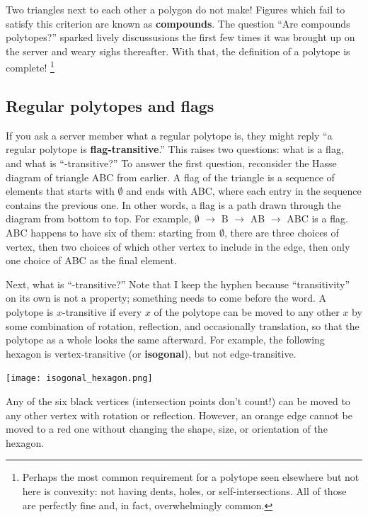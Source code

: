 \documentclass{article}
\begin{document}
Two triangles next to each other a polygon do not make!
Figures which fail to satisfy this criterion are known as \textbf{compounds}.
The question ``Are compounds polytopes?'' sparked lively discussusions
the first few times it was brought up on the server
and weary sighs thereafter.
With that, the definition of a polytope is complete!
\footnote{
  Perhaps the most common requirement for a polytope seen elsewhere but not here
  is convexity: not having dents, holes, or self-intersections.
  All of those are perfectly fine and, in fact, overwhelmingly common.
}

\subsection{Regular polytopes and flags}
\label{flag}

If you ask a server member what a regular polytope is,
they might reply ``a regular polytope is \textbf{flag-transitive}.''
This raises two questions: what is a flag, and what is ``-transitive?''
To answer the first question, reconsider the Hasse diagram of triangle ABC from earlier.
A flag of the triangle is a sequence of elements that starts with $\emptyset$ and ends with ABC,
where each entry in the sequence contains the previous one.
In other words, a flag is a path drawn through the diagram from bottom to top.
For example, $\emptyset$ $\rightarrow$ B $\rightarrow$ AB $\rightarrow$ ABC is a flag.
ABC happens to have six of them:
starting from $\emptyset$, there are three choices of vertex,
then two choices of which other vertex to include in the edge,
then only one choice of ABC as the final element.

Next, what is ``-transitive?''
Note that I keep the hyphen
because ``transitivity'' on its own is not a property;
something needs to come before the word.
A polytope is $x$-transitive if
every $x$ of the polytope can be moved to any other $x$
by some combination of rotation, reflection, and occasionally translation,
so that the polytope as a whole looks the same afterward.
For example, the following hexagon is vertex-transitive (or \textbf{isogonal}),
but not edge-transitive.

\begin{center}
\texttt{[image: isogonal\_hexagon.png]}
\end{center}

Any of the six black vertices (intersection points don't count!)
can be moved to any other vertex with rotation or reflection.
However, an orange edge cannot be moved to a red one
without changing the shape, size, or orientation of the hexagon.
\end{document}

